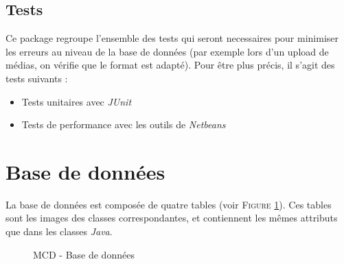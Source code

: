 \subsection{Tests}

Ce package regroupe l'ensemble des tests qui seront necessaires pour minimiser les erreurs au niveau de la base de données (par exemple lors d'un upload de médias, on vérifie que le format est adapté). Pour être plus précis, il s'agit des tests suivants :
\begin{itemize}
 \item Tests unitaires avec \textit{JUnit}
 \item Tests de performance avec les outils de \textit{Netbeans}
\end{itemize}


\section{Base de données}

La base de données est composée de quatre tables (voir \textsc{Figure} \ref{MCD}). Ces tables sont les images des classes correspondantes, et contiennent les mêmes attributs que dans les classes \textit{Java}.

\begin{figure}[!h]
\begin{center}
  \caption{MCD - Base de données}
  \label{MCD} 
\end{center}
\end{figure}


